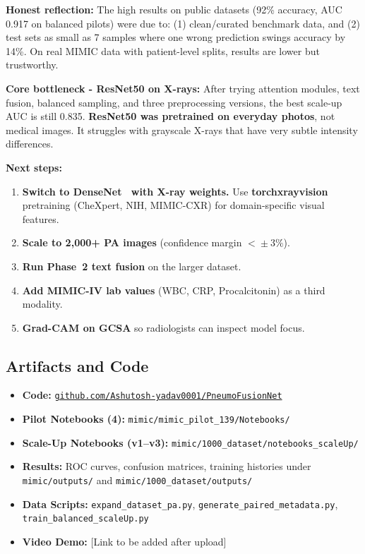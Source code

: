 \documentclass{article}
\begin{document}
\textbf{Honest reflection:}
The high results on public datasets (92\% accuracy, AUC 0.917 on balanced
pilots) were due to: (1) clean/curated benchmark data, and (2) test sets as
small as 7 samples where one wrong prediction swings accuracy by 14\%.
On real MIMIC data with patient-level splits, results are lower but trustworthy.

\textbf{Core bottleneck - ResNet50 on X-rays:}
After trying attention modules, text fusion, balanced sampling, and three
preprocessing versions, the best scale-up AUC is still 0.835.
\textbf{ResNet50 was pretrained on everyday photos}, not medical images.
It struggles with grayscale X-rays that have very subtle intensity differences.

\textbf{Next steps:}
\begin{enumerate}[noitemsep, leftmargin=*, topsep=2pt]
  \item \textbf{Switch to DenseNet~\cite{huang2017densenet} with X-ray weights.}
        Use \textbf{torchxrayvision} pretraining (CheXpert, NIH, MIMIC-CXR)
        for domain-specific visual features.
  \item \textbf{Scale to 2{,}000+ PA images} (confidence margin $<\!\pm3\%$).
  \item \textbf{Run Phase~2 text fusion} on the larger dataset.
  \item \textbf{Add MIMIC-IV lab values} (WBC, CRP, Procalcitonin) as
        a third modality.
  \item \textbf{Grad-CAM on GCSA} so radiologists can inspect model focus.
\end{enumerate}

\subsection*{Artifacts and Code}
\begin{itemize}[noitemsep, leftmargin=*, topsep=2pt]
  \item \textbf{Code:}
    \href{https://github.com/Ashutosh-yadav0001/PneumoFusionNet}%
    {\texttt{github.com/Ashutosh-yadav0001/PneumoFusionNet}}
  \item \textbf{Pilot Notebooks (4):} \texttt{mimic/mimic\_pilot\_139/Notebooks/}
  \item \textbf{Scale-Up Notebooks (v1--v3):}
    \texttt{mimic/1000\_dataset/notebooks\_scaleUp/}
  \item \textbf{Results:} ROC curves, confusion matrices, training histories
    under \texttt{mimic/outputs/} and \texttt{mimic/1000\_dataset/outputs/}
  \item \textbf{Data Scripts:} \texttt{expand\_dataset\_pa.py},
    \texttt{generate\_paired\_metadata.py}, \texttt{train\_balanced\_scaleUp.py}
  \item \textbf{Video Demo:} [Link to be added after upload]
\end{itemize}
\end{document}
